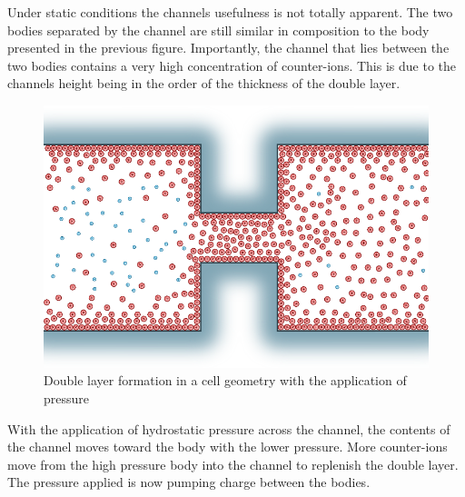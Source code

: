     Under static conditions the channels usefulness is not totally apparent.
    The two bodies separated by the channel are still similar in composition to the body presented in the previous figure.
    Importantly, the channel that lies between the two bodies contains a very high concentration of counter-ions.
    This is due to the channels height being in the order of the thickness of the double layer.


    \begin{figure}
        \centering
        \includegraphics{content/pt1/01-PowerHarvesting/graphics/intro_cell_pressure}
        \caption{\label{fig:doubleLayerInChannel_pressure}Double layer formation in a cell geometry with the application of pressure}
    \end{figure}

    With the application of hydrostatic pressure across the channel, the contents of the channel moves toward the body with the lower pressure.
    More counter-ions move from the high pressure body into the channel to replenish the double layer.
    The pressure applied is now pumping charge between the bodies.





